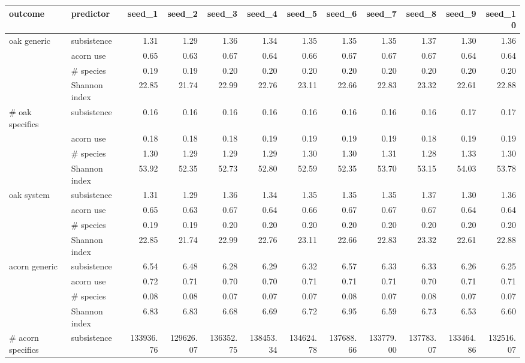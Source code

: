 \begin{table}[ht]
\centering
\begin{tabular}{llrrrrrrrrrr}
  \hline
outcome & predictor & seed_1 & seed_2 & seed_3 & seed_4 & seed_5 & seed_6 & seed_7 & seed_8 & seed_9 & seed_10 \\ 
  \hline
oak generic & subsistence & 1.31 & 1.29 & 1.36 & 1.34 & 1.35 & 1.35 & 1.35 & 1.37 & 1.30 & 1.36 \\ 
   & acorn use & 0.65 & 0.63 & 0.67 & 0.64 & 0.66 & 0.67 & 0.67 & 0.67 & 0.64 & 0.64 \\ 
   & # species & 0.19 & 0.19 & 0.20 & 0.20 & 0.20 & 0.20 & 0.20 & 0.20 & 0.20 & 0.20 \\ 
   & Shannon index & 22.85 & 21.74 & 22.99 & 22.76 & 23.11 & 22.66 & 22.83 & 23.32 & 22.61 & 22.88 \\ 
  # oak specifics & subsistence & 0.16 & 0.16 & 0.16 & 0.16 & 0.16 & 0.16 & 0.16 & 0.16 & 0.17 & 0.17 \\ 
   & acorn use & 0.18 & 0.18 & 0.18 & 0.19 & 0.19 & 0.19 & 0.19 & 0.18 & 0.19 & 0.19 \\ 
   & # species & 1.30 & 1.29 & 1.29 & 1.29 & 1.30 & 1.30 & 1.31 & 1.28 & 1.33 & 1.30 \\ 
   & Shannon index & 53.92 & 52.35 & 52.73 & 52.80 & 52.59 & 52.35 & 53.70 & 53.15 & 54.03 & 53.78 \\ 
  oak system & subsistence & 1.31 & 1.29 & 1.36 & 1.34 & 1.35 & 1.35 & 1.35 & 1.37 & 1.30 & 1.36 \\ 
   & acorn use & 0.65 & 0.63 & 0.67 & 0.64 & 0.66 & 0.67 & 0.67 & 0.67 & 0.64 & 0.64 \\ 
   & # species & 0.19 & 0.19 & 0.20 & 0.20 & 0.20 & 0.20 & 0.20 & 0.20 & 0.20 & 0.20 \\ 
   & Shannon index & 22.85 & 21.74 & 22.99 & 22.76 & 23.11 & 22.66 & 22.83 & 23.32 & 22.61 & 22.88 \\ 
  acorn generic & subsistence & 6.54 & 6.48 & 6.28 & 6.29 & 6.32 & 6.57 & 6.33 & 6.33 & 6.26 & 6.25 \\ 
   & acorn use & 0.72 & 0.71 & 0.70 & 0.70 & 0.71 & 0.71 & 0.71 & 0.70 & 0.71 & 0.71 \\ 
   & # species & 0.08 & 0.08 & 0.07 & 0.07 & 0.07 & 0.08 & 0.07 & 0.08 & 0.07 & 0.07 \\ 
   & Shannon index & 6.83 & 6.83 & 6.68 & 6.69 & 6.72 & 6.95 & 6.59 & 6.73 & 6.53 & 6.60 \\ 
  # acorn specifics & subsistence & 133936.76 & 129626.07 & 136352.75 & 138453.34 & 134624.78 & 137688.66 & 133779.00 & 137783.07 & 133464.86 & 132516.07 \\ 

\end{tabular}
\end{table}
